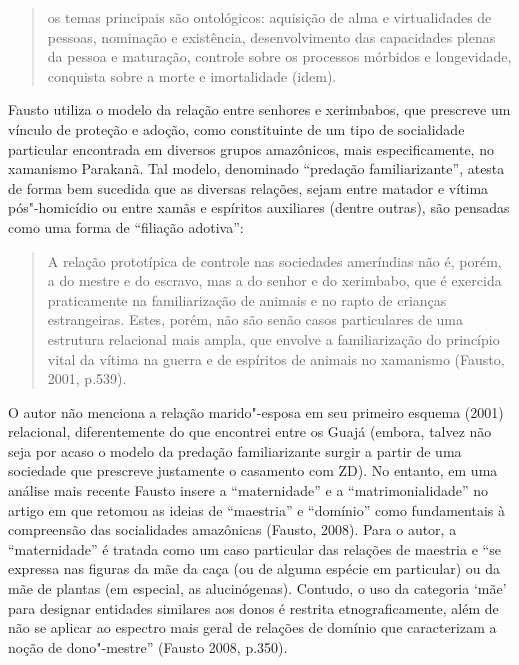 \begin{quote}
os temas principais são ontológicos: aquisição de alma e virtualidades
de pessoas, nominação e existência, desenvolvimento das capacidades
plenas da pessoa e maturação, controle sobre os processos mórbidos e
longevidade, conquista sobre a morte e imortalidade (idem).
\end{quote}

Fausto utiliza o modelo da relação entre senhores e xerimbabos, que
prescreve um vínculo de proteção e adoção, como constituinte de um tipo
de socialidade particular encontrada em diversos grupos amazônicos, mais
especificamente, no xamanismo Parakanã. Tal modelo, denominado
``predação familiarizante'', atesta de forma bem sucedida que as
diversas relações, sejam entre matador e vítima pós"-homicídio ou entre
xamãs e espíritos auxiliares (dentre outras), são pensadas como uma
forma de ``filiação adotiva'':

\begin{quote}
A relação prototípica de controle nas sociedades ameríndias não é,
porém, a do mestre e do escravo, mas a do senhor e do xerimbabo, que é
exercida praticamente na familiarização de animais e no rapto de
crianças estrangeiras. Estes, porém, não são senão casos particulares de
uma estrutura relacional mais ampla, que envolve a familiarização do
princípio vital da vítima na guerra e de espíritos de animais no
xamanismo (Fausto, 2001, p.539).
\end{quote}

O autor não menciona a relação marido"-esposa em seu primeiro esquema
(2001) relacional, diferentemente do que encontrei entre os Guajá
(embora, talvez não seja por acaso o modelo da predação familiarizante
surgir a partir de uma sociedade que prescreve justamente o casamento
com ZD). No entanto, em uma análise mais recente Fausto insere a
``maternidade'' e a ``matrimonialidade'' no artigo em que retomou as ideias
de ``maestria'' e ``domínio'' como fundamentais à compreensão das
socialidades amazônicas (Fausto, 2008). Para o autor, a ``maternidade'' é
tratada como um caso particular das relações de maestria e ``se expressa
nas figuras da mãe da caça (ou de alguma espécie em particular) ou da
mãe de plantas (em especial, as alucinógenas). Contudo, o uso da
categoria `mãe' para designar entidades similares aos donos é restrita
etnograficamente, além de não se aplicar ao espectro mais geral de
relações de domínio que caracterizam a noção de dono"-mestre'' (Fausto
2008, p.350).

